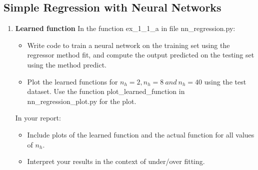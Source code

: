\documentclass[a4paper]{article}
\begin{document}
\subsection{Simple Regression with Neural Networks}
\begin{enumerate}[label=(\alph*)]
\item \textbf{Learned function}
    In the function ex\_1\_1\_a in file nn\_regression.py:
    \begin{itemize}
        \item Write code to train a neural network on the training set using the regressor method fit, and compute the output predicted on the testing set using the method predict.
        \item Plot the learned functions for $n_h = 2, n_h = 8 ~and ~n_h = 40$ using the test dataset. Use the function plot\_learned\_function in nn\_regression\_plot.py for the plot.
    \end{itemize}
    In your report:    
    \begin{itemize}
        \item Include plots of the learned function and the actual function for all values of $n_h$.
        \item Interpret your results in the context of under/over fitting.
	\end{itemize}


\end{enumerate}
\end{document}
